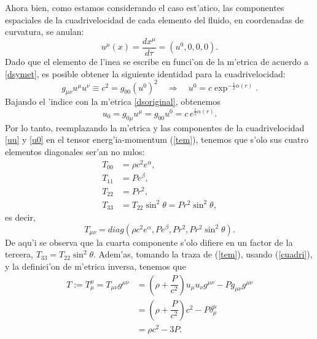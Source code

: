 Ahora bien, como estamos considerando el caso est'atico, las componentes espaciales de la cuadrivelocidad de cada elemento del fluido, en coordenadas de curvatura, se anulan:
\begin{equation}\label{uu}
 u^{\mu}(x)=\frac{dx^{\mu}}{d\tau}=(u^0,0,0,0).
\end{equation}
Dado que el elemento de l'inea se escribe en funci'on de la m'etrica de acuerdo a \eqref{dsymet}, es posible obtener la siguiente identidad para la cuadrivelocidad:
\begin{equation}\label{cuadri}
g_{\mu\nu}u^{\mu}u^{\nu}\equiv c^2=g_{00}(u^0)^2\quad\Rightarrow\quad u^{0}=c\exp^{-\frac{1}{2}\alpha(r)}.
\end{equation}
Bajando el 'indice con la m'etrica \eqref{dsoriginal}, obtenemos
\begin{equation}\label{u0}
 u_0=g_{0\mu}u^{\mu}=g_{00}u^{0}=c\,e^{\frac{1}{2}\alpha(r)}.
\end{equation}
Por lo tanto, reemplazando la m'etrica y las componentes de la cuadrivelocidad  \eqref{uu} y \eqref{u0} en el tensor energ'ia-momentum (\ref{tem}), tenemos que s'olo sus cuatro elementos diagonales ser'an no nulos:
\begin{align}
T_{00}&=\rho c^2 e^{\alpha},\nonumber\\
T_{11}&=P e^{\beta},\nonumber\\
T_{22}&=P r^2,\label{tem2}\\
T_{33}&=T_{22}\sin^2\theta=P r^2\sin^2\theta,\nonumber
\end{align}
es decir,
\begin{equation}\label{tem3}
 \boxed{T_{\mu\nu}=diag(\rho c^2 e^{\alpha},P e^{\beta},P r^2,P r^2\sin^2\theta).}
\end{equation}
De aqu'i se observa que la cuarta componente s'olo difiere en un factor de la tercera, $T_{33}=T_{22}\sin^2\theta$. Adem'as, tomando la traza de (\ref{tem}), usando (\ref{cuadri}), y la definici'on de m'etrica inversa, tenemos que
\begin{align}\label{traza}
T:=T^{\mu}_{\mu}=T_{\mu\nu}g^{\mu\nu}&=\left(\rho+\dfrac{P}{c^2}\right)u_{\mu}u_{\nu}g^{\mu\nu}-Pg_{\mu\nu}g^{\mu\nu}\\
&=\left(\rho+\dfrac{P}{c^2}\right)c^2-P\delta_{\mu}^{\mu}\\
&=\rho c^2-3P.
\end{align}

